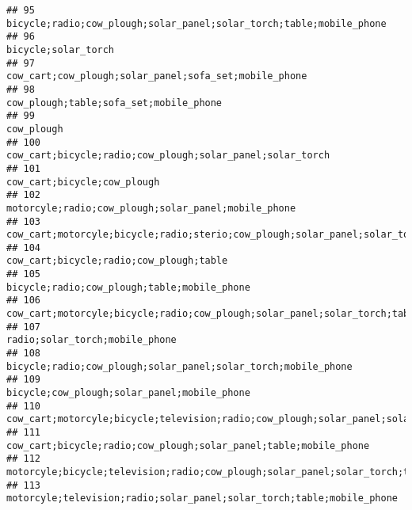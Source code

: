 \documentclass[
]{article}
\begin{document}
\begin{verbatim}
## 95                                                                       bicycle;radio;cow_plough;solar_panel;solar_torch;table;mobile_phone
## 96                                                                                                                       bicycle;solar_torch
## 97                                                                                     cow_cart;cow_plough;solar_panel;sofa_set;mobile_phone
## 98                                                                                                    cow_plough;table;sofa_set;mobile_phone
## 99                                                                                                                                cow_plough
## 100                                                                                cow_cart;bicycle;radio;cow_plough;solar_panel;solar_torch
## 101                                                                                                              cow_cart;bicycle;cow_plough
## 102                                                                                      motorcyle;radio;cow_plough;solar_panel;mobile_phone
## 103                                            cow_cart;motorcyle;bicycle;radio;sterio;cow_plough;solar_panel;solar_torch;table;mobile_phone
## 104                                                                                                  cow_cart;bicycle;radio;cow_plough;table
## 105                                                                                              bicycle;radio;cow_plough;table;mobile_phone
## 106                                                   cow_cart;motorcyle;bicycle;radio;cow_plough;solar_panel;solar_torch;table;mobile_phone
## 107                                                                                                           radio;solar_torch;mobile_phone
## 108                                                                            bicycle;radio;cow_plough;solar_panel;solar_torch;mobile_phone
## 109                                                                                              bicycle;cow_plough;solar_panel;mobile_phone
## 110                                        cow_cart;motorcyle;bicycle;television;radio;cow_plough;solar_panel;solar_torch;table;mobile_phone
## 111                                                                         cow_cart;bicycle;radio;cow_plough;solar_panel;table;mobile_phone
## 112                                                 motorcyle;bicycle;television;radio;cow_plough;solar_panel;solar_torch;table;mobile_phone
## 113                                                                    motorcyle;television;radio;solar_panel;solar_torch;table;mobile_phone

\end{verbatim}
\end{document}
